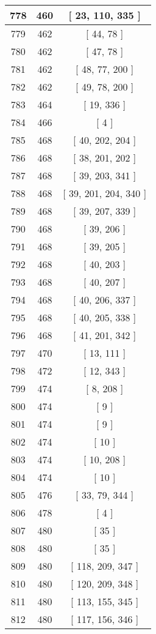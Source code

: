 \begin{center}
\begin{longtable}[H]{|| c c c ||}
\hline
778 & 460 & [ 23, 110, 335 ] \\ 
\hline
779 & 462 & [ 44, 78 ] \\ 
\hline
780 & 462 & [ 47, 78 ] \\ 
\hline
781 & 462 & [ 48, 77, 200 ] \\ 
\hline
782 & 462 & [ 49, 78, 200 ] \\ 
\hline
783 & 464 & [ 19, 336 ] \\ 
\hline
784 & 466 & [ 4 ] \\ 
\hline
785 & 468 & [ 40, 202, 204 ] \\ 
\hline
786 & 468 & [ 38, 201, 202 ] \\ 
\hline
787 & 468 & [ 39, 203, 341 ] \\ 
\hline
788 & 468 & [ 39, 201, 204, 340 ] \\ 
\hline
789 & 468 & [ 39, 207, 339 ] \\ 
\hline
790 & 468 & [ 39, 206 ] \\ 
\hline
791 & 468 & [ 39, 205 ] \\ 
\hline
792 & 468 & [ 40, 203 ] \\ 
\hline
793 & 468 & [ 40, 207 ] \\ 
\hline
794 & 468 & [ 40, 206, 337 ] \\ 
\hline
795 & 468 & [ 40, 205, 338 ] \\ 
\hline
796 & 468 & [ 41, 201, 342 ] \\ 
\hline
797 & 470 & [ 13, 111 ] \\ 
\hline
798 & 472 & [ 12, 343 ] \\ 
\hline
799 & 474 & [ 8, 208 ] \\ 
\hline
800 & 474 & [ 9 ] \\ 
\hline
801 & 474 & [ 9 ] \\ 
\hline
802 & 474 & [ 10 ] \\ 
\hline
803 & 474 & [ 10, 208 ] \\ 
\hline
804 & 474 & [ 10 ] \\ 
\hline
805 & 476 & [ 33, 79, 344 ] \\ 
\hline
806 & 478 & [ 4 ] \\ 
\hline
807 & 480 & [ 35 ] \\ 
\hline
808 & 480 & [ 35 ] \\ 
\hline
809 & 480 & [ 118, 209, 347 ] \\ 
\hline
810 & 480 & [ 120, 209, 348 ] \\ 
\hline
811 & 480 & [ 113, 155, 345 ] \\ 
\hline
812 & 480 & [ 117, 156, 346 ] \\ 

\end{longtable}
\end{center}
